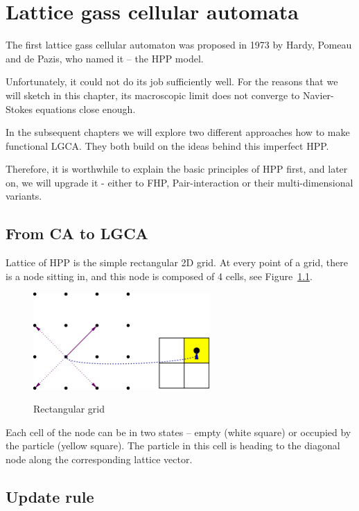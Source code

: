 \chapter{Lattice gass cellular automata}
The first lattice gass cellular automaton was proposed in 1973 by Hardy, Pomeau and de Pazis, who named it -- the HPP model.

Unfortunately, it could not do its job sufficiently well. For the reasons that we will sketch in this chapter, its macroscopic limit does not converge to Navier-Stokes equations close enough.

\bigskip

In the subsequent chapters we will explore two different approaches how to make functional LGCA. They both build on the ideas behind this imperfect HPP.

Therefore, it is worthwhile to explain the basic principles of HPP first, and later on, we will upgrade it - either to FHP, Pair-interaction or their multi-dimensional variants.

\section{From CA to LGCA}

Lattice of HPP is the simple rectangular 2D grid. At every point of a grid, there is a node sitting in, and this node is composed of 4 cells, see Figure~\ref{rectangular}.

\begin{figure}[htbp]
 \centering
 \includegraphics[width=0.6\textwidth]{./img/hppnode}
 \label{rectangular}
 \caption{Rectangular grid}
\end{figure}

Each cell of the node can be in two states -- empty (white square) or occupied by the particle (yellow square).
The particle in this cell is heading to the diagonal node along the corresponding lattice vector.

\section{Update rule}


